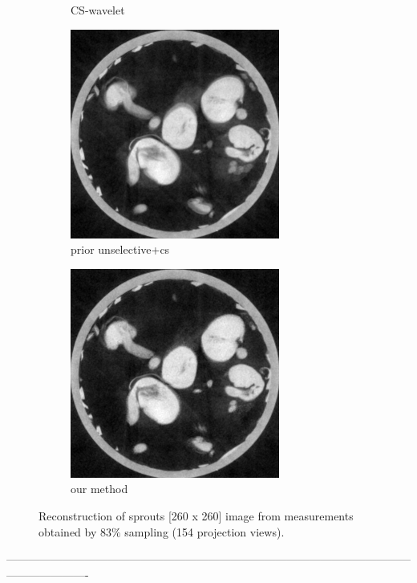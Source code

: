 \documentclass{article}
\begin{document}
\begin{figure}[h]
\begin{subfigure}[b]{0.3\linewidth}
        \caption{CS-wavelet}
     \end{subfigure}
\quad
    \begin{subfigure}[b]{0.3\linewidth}
        \includegraphics[width=\textwidth]{../images/supplementary/2D_sprouts/154_angles/1/plain_pca.png}
        \caption{prior unselective+cs}
     \end{subfigure}
\quad
    \begin{subfigure}[b]{0.3\linewidth}
        \includegraphics[width=\textwidth]{../images/supplementary/2D_sprouts/154_angles/1/weighted_pca5.png}
        \caption{our method}
     \end{subfigure}
     \caption{Reconstruction of sprouts [260 x 260] image from measurements obtained by $83\%$ sampling (154 projection views).} 
\label{fig:joint}
\end{figure}
----------------------------------------------------------------------------------------------------------------------------------

\end{document}
